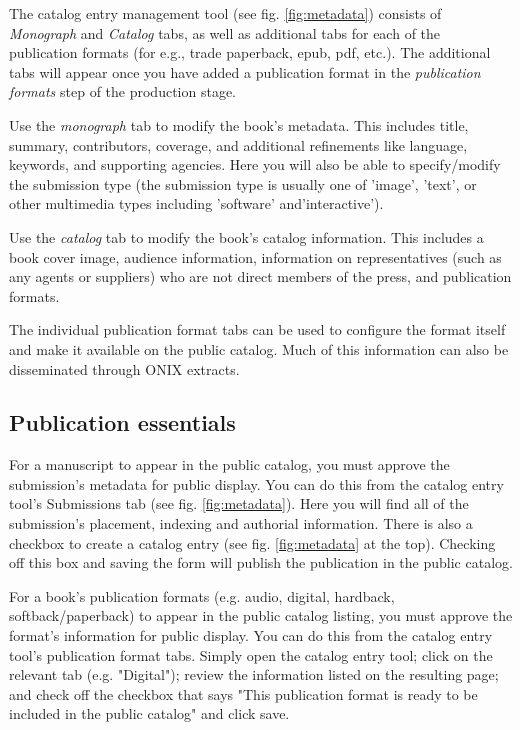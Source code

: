 The catalog entry management tool (see fig. \ref{fig:metadata}) consists of \textit{Monograph} and \textit{Catalog} tabs, as well as additional tabs for each of the publication formats (for e.g., trade paperback, epub, pdf, etc.). The additional tabs will appear once you have added a publication format in the \textit{publication formats} step of the production stage. 

Use the \textit{monograph} tab to modify the book's metadata. This includes title, summary, contributors, coverage, and additional refinements like language, keywords, and supporting agencies. Here you will also be able to specify/modify the submission type (the submission type is usually one of 'image', 'text', or other multimedia types including 'software' and'interactive').

Use the \textit{catalog} tab to modify the book's catalog information. This includes a book cover image, audience information, information on representatives (such as any agents or suppliers) who are not direct members of the press, and publication formats. 

The individual publication format tabs can be used to configure the format itself and make it available on the public catalog. Much of this information can also be disseminated through ONIX extracts.

\subsection*{Publication essentials}

For a manuscript to appear in the public catalog, you must approve the submission's metadata for public display. You can do this from the catalog entry tool's Submissions tab (see fig. \ref{fig:metadata}). Here you will find all of the submission's placement, indexing and authorial information. There is also a checkbox to create a catalog entry (see fig. \ref{fig:metadata} at the top). Checking off this box and saving the form will publish the publication in the public catalog.

For a book's publication formats (e.g. audio, digital, hardback, softback/paperback) to appear in the public catalog listing, you must approve the format's information for public display. You can do this from the catalog entry tool's publication format tabs. Simply open the catalog entry tool; click on the relevant tab (e.g. "Digital"); review the information listed on the resulting page; and check off the checkbox that says "This publication format is ready to be included in the public catalog" and click save.

